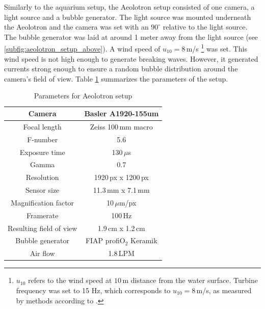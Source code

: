 		Similarly to the aquarium setup, the Aeolotron setup consisted of one camera, a light source and a bubble generator. 
		The light source was mounted underneath the Aeolotron and the camera was set with an $90^\circ$ relative to the light source. The bubble generator was laid at around 1 meter away from the light source (see \ref{subfig:aeolotron_setup_above}). A wind speed of $u_{10} = 8$\,m/s \footnote{$u_{10}$ refers to the wind speed at $10$\,m distance from the water surface. Turbine frequency was set to 15 Hz, which corresponds to $u_{10} = 8$\,m/s, as measured by methods according to \citet{Bopp2011}.} was set. This wind speed is not high enough to generate breaking waves. However, it generated currents strong enough to ensure a random bubble distribution around the camera's field of view. Table \ref{tab:aeolotron_setup} summarizes the parameters of the setup.
	
		\begin{table}
			\centering
		
			\begin{tabular}{|c|c|}
			\hline 
			Camera & Basler A1920-155um \\ 
			\hline 
			Focal length & Zeiss 100\,mm macro\\ 
			\hline 
			F-number & 5.6 \\ 
			\hline 
			Exposure time & 130\,$\mu$s \\ 
			\hline 
			Gamma & 0.7 \\
			\hline
			Resolution &1920\,px x 1200\,px \\
			\hline 
			Sensor size & 11.3\,mm x 7.1\,mm \\
			\hline 
			Magnification factor & 10\,$\mu$m/px \\ 
			\hline 
			Framerate & 100\,Hz \\ 
			\hline 
			Resulting field of view & 1.9\,cm x 1.2\,cm \\
			\hline
			Bubble generator & FIAP profiO$_2$ Keramik\\			
			\hline
			Air flow & 1.8\,LPM  \\ 
			\hline
			\end{tabular} 
			
			\caption{Parameters for Aeolotron setup}
			\label{tab:aeolotron_setup}

		\end{table}
		
